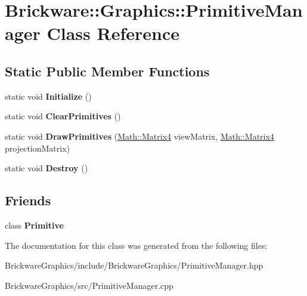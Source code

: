 \hypertarget{classBrickware_1_1Graphics_1_1PrimitiveManager}{}\section{Brickware\+:\+:Graphics\+:\+:Primitive\+Manager Class Reference}
\label{classBrickware_1_1Graphics_1_1PrimitiveManager}
\subsection*{Static Public Member Functions}
\begin{DoxyCompactItemize}
\item 
\hypertarget{classBrickware_1_1Graphics_1_1PrimitiveManager_ab2c57e35aa3527f1bfbf7e3093f27c0e}{}static void {\bfseries Initialize} ()\label{classBrickware_1_1Graphics_1_1PrimitiveManager_ab2c57e35aa3527f1bfbf7e3093f27c0e}

\item 
\hypertarget{classBrickware_1_1Graphics_1_1PrimitiveManager_a8b4188c9866cea2ca7ba6b6114289f59}{}static void {\bfseries Clear\+Primitives} ()\label{classBrickware_1_1Graphics_1_1PrimitiveManager_a8b4188c9866cea2ca7ba6b6114289f59}

\item 
\hypertarget{classBrickware_1_1Graphics_1_1PrimitiveManager_ad3785c1f276e31eb4d4ded9c918b1647}{}static void {\bfseries Draw\+Primitives} (\hyperlink{classBrickware_1_1Math_1_1Matrix4}{Math\+::\+Matrix4} view\+Matrix, \hyperlink{classBrickware_1_1Math_1_1Matrix4}{Math\+::\+Matrix4} projection\+Matrix)\label{classBrickware_1_1Graphics_1_1PrimitiveManager_ad3785c1f276e31eb4d4ded9c918b1647}

\item 
\hypertarget{classBrickware_1_1Graphics_1_1PrimitiveManager_a9c70f8fdb57f8c31a179c5c76a535541}{}static void {\bfseries Destroy} ()\label{classBrickware_1_1Graphics_1_1PrimitiveManager_a9c70f8fdb57f8c31a179c5c76a535541}

\end{DoxyCompactItemize}
\subsection*{Friends}
\begin{DoxyCompactItemize}
\item 
\hypertarget{classBrickware_1_1Graphics_1_1PrimitiveManager_a6a4d7daa0ec1975b98cf7599de187e02}{}class {\bfseries Primitive}\label{classBrickware_1_1Graphics_1_1PrimitiveManager_a6a4d7daa0ec1975b98cf7599de187e02}

\end{DoxyCompactItemize}


The documentation for this class was generated from the following files\+:\begin{DoxyCompactItemize}
\item 
Brickware\+Graphics/include/\+Brickware\+Graphics/Primitive\+Manager.\+hpp\item 
Brickware\+Graphics/src/Primitive\+Manager.\+cpp\end{DoxyCompactItemize}
